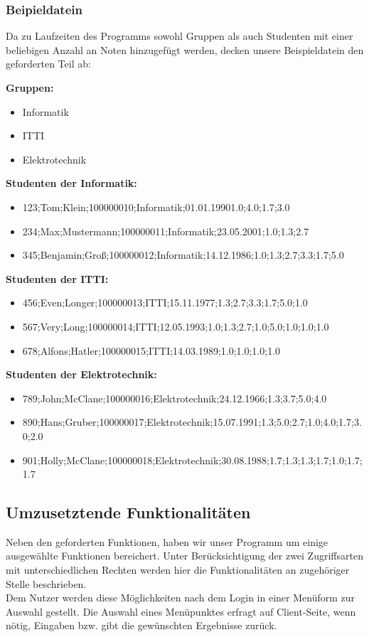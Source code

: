 \documentclass{scrartcl}
\begin{document}
		\subsubsection{Beipieldatein}
			Da zu Laufzeiten des Programms sowohl Gruppen als auch Studenten mit einer beliebigen Anzahl an Noten hinzugefügt werden, decken unsere Beispieldatein den geforderten Teil ab:
			
			\textbf{Gruppen:}
			\begin{itemize}
				\item Informatik
				\item ITTI
				\item Elektrotechnik
			\end{itemize}
			
			\textbf{Studenten der Informatik:}
			\begin{itemize}
				\item 123;Tom;Klein;100000010;Informatik;01.01.19901.0;4.0;1.7;3.0
				\item 234;Max;Mustermann;100000011;Informatik;23.05.2001;1.0;1.3;2.7
				\item 345;Benjamin;Groß;100000012;Informatik;14.12.1986;1.0;1.3;2.7;3.3;1.7;5.0
			\end{itemize}
			
			\textbf{Studenten der ITTI:}
			\begin{itemize}
				\item 456;Even;Longer;100000013;ITTI;15.11.1977;1.3;2.7;3.3;1.7;5.0;1.0
				\item 567;Very;Long;100000014;ITTI;12.05.1993;1.0;1.3;2.7;1.0;5.0;1.0;1.0;1.0
				\item 678;Alfons;Hatler;100000015;ITTI;14.03.1989;1.0;1.0;1.0;1.0
			\end{itemize}
			
			\textbf{Studenten der Elektrotechnik:}
			\begin{itemize}
				\item 789;John;McClane;100000016;Elektrotechnik;24.12.1966;1.3;3.7;5.0;4.0
				\item 890;Hans;Gruber;100000017;Elektrotechnik;15.07.1991;1.3;5.0;2.7;1.0;4.0;1.7;3.0;2.0
				\item 901;Holly;McClane;100000018;Elektrotechnik;30.08.1988;1.7;1.3;1.3;1.7;1.0;1.7;1.7
			\end{itemize}
		
	\subsection{Umzusetztende Funktionalitäten}
		Neben den geforderten Funktionen, haben wir unser Programm um einige ausgewählte Funktionen bereichert. Unter Berücksichtigung der zwei Zugriffsarten mit unterschiedlichen Rechten werden hier die Funktionalitäten an zugehöriger Stelle beschrieben.\\
		Dem Nutzer werden diese Möglichkeiten nach dem Login in einer Menüform zur Auswahl gestellt. Die Auswahl eines Menüpunktes erfragt auf Client-Seite, wenn nötig, Eingaben bzw. gibt die gewünschten Ergebnisse zurück.
\end{document}

